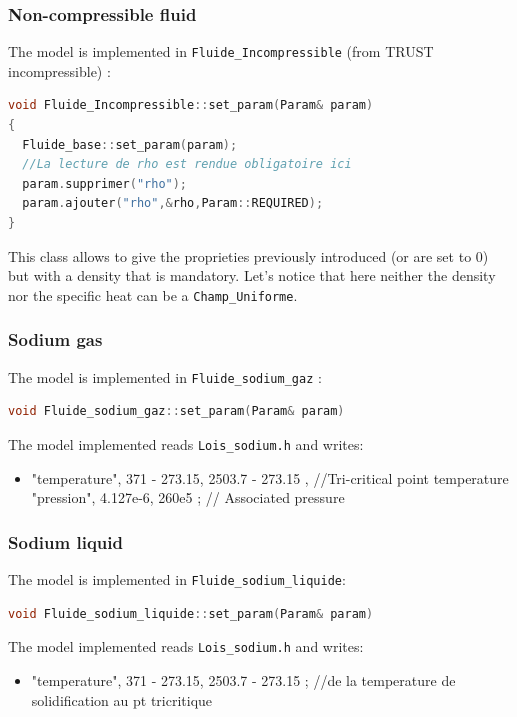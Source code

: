 \subsubsection{Non-compressible fluid}
The model is implemented in \texttt{Fluide\_Incompressible} (from TRUST incompressible) :
\begin{lstlisting}[language=c++]
void Fluide_Incompressible::set_param(Param& param)
{
  Fluide_base::set_param(param);
  //La lecture de rho est rendue obligatoire ici
  param.supprimer("rho");
  param.ajouter("rho",&rho,Param::REQUIRED);
}
\end{lstlisting}
This class allows to give the proprieties previously introduced (or are set to $0$) but with a density that is mandatory. Let's notice that here neither the density nor the specific heat can be a \texttt{Champ_Uniforme}.

\subsubsection{Sodium gas}
The model is implemented in \texttt{Fluide\_sodium\_gaz} :
\begin{lstlisting}[language=c++]
void Fluide_sodium_gaz::set_param(Param& param)
\end{lstlisting}
The model implemented reads \texttt{Lois\_sodium.h} and writes:
\begin{itemize}
   \item[\small \textcolor{blue}{\ding{109}}] { "temperature", { 371 - 273.15, 2503.7 - 273.15 } }, //Tri-critical point temperature { "pression", { 4.127e-6, 260e5 } };                // Associated pressure
\end{itemize}

\subsubsection{Sodium liquid}
The model is implemented in \texttt{Fluide\_sodium\_liquide}:
\begin{lstlisting}[language=c++]
void Fluide_sodium_liquide::set_param(Param& param)
\end{lstlisting}
The model implemented reads \texttt{Lois\_sodium.h} and writes:
\begin{itemize}
  \item[\small \textcolor{blue}{\ding{109}}] { "temperature", { 371 - 273.15, 2503.7 - 273.15 } }; //de la temperature de solidification au pt tricritique
\end{itemize}

